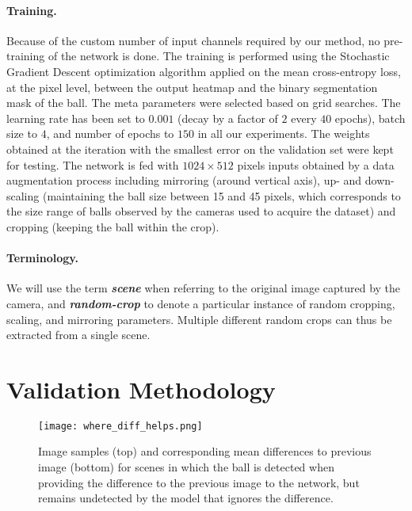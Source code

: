 \documentclass[sigconf, screen]{acmart}
\begin{document}
\paragraph{Training.}
Because of the custom number of input channels required by our method, no pre-training of the network is done.
The training is performed using the Stochastic Gradient Descent optimization algorithm applied on the mean cross-entropy loss, at the pixel level, between the output heatmap and the binary segmentation mask of the ball.
The meta parameters were selected based on grid searches. The learning rate has been set to $0.001$ (decay by a factor of $2$ every $40$ epochs), batch size to $4$, and number of epochs to $150$ in all our experiments. The weights obtained at the iteration with the smallest error on the validation set were kept for testing.
The network is fed with $1024\times512$ pixels inputs obtained by a data augmentation process including mirroring (around vertical axis), up- and down- scaling (maintaining the ball size between 15 and 45 pixels, which corresponds to the size range of balls observed by the cameras used to acquire the dataset) and cropping (keeping the ball within the crop).

\paragraph{Terminology.}
We will use the term \emph{\bf scene} when referring to the original image captured by the camera, and \emph{\bf random-crop} to denote a particular instance of random cropping, scaling, and mirroring parameters. Multiple different random crops can thus be extracted from a single scene.





\section{Validation Methodology}
\label{sec:validation}

\begin{figure*}
    \begin{center}
    \texttt{[image: where\_diff\_helps.png]}
    \end{center}
    \vspace{-0.5em}
    \caption{Image samples (top) and corresponding mean differences to previous image (bottom) for scenes in which the ball is detected when providing the difference to the previous image to the network, but remains undetected by the model that ignores the difference.}
    \label{fig:where_diff_helps}
\end{figure*}
\end{document}
